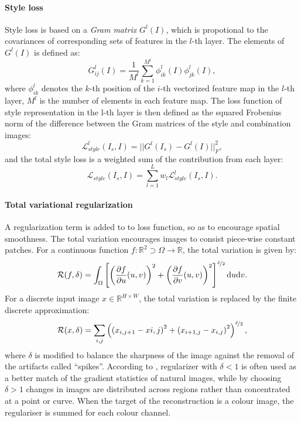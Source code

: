 \documentclass{article}
\begin{document}
\paragraph{Style loss} Style loss is based on a \textit{Gram matrix} $G^l(I)$,
which is propotional to the covariances of corresponding sets of features in the $l$-th layer. The elements of $G^l(I)$ is defined as:
\begin{equation}
G_{ij}^l(I) = \frac{1}{M^l}\sum_{k=1}^{M^l}\phi_{ik}^l(I)\phi_{jk}^l(I),
\end{equation}
where $\phi_{ik}^l$ denotes the $k$-th position of the $i$-th vectorized feature map in the $l$-th layer, $M^l$ is the number of elements in each feature map. 
The loss function of style representation in the l-th layer is then defined as the squared Frobenius norm of the difference between the Gram matrices of the style
and combination images:
\begin{equation}
\mathcal{L}_{style}^l(I_s,I) = ||G^l(I_s) - G^l(I)||_F^2,
\end{equation}
and the total style loss is a weighted sum of the contribution from each layer:
\begin{equation}
\mathcal{L}_{style}(I_s,I) = \sum_{l=1}^Lw_l\mathcal{L}_{style}^l(I_s,I).
\end{equation}

\paragraph{Total variational regularization} A regularization term is added to to loss function, so as to encourage spatial smoothness. 
The total variation encourages images to consist piece-wise constant patches. 
For a continuous function $f:\mathbb{R}^2\supset \Omega \to \mathbb{R}$, the total variation is given by:
\begin{equation}
\mathcal{R}(f,\delta) = \int_{\Omega}\left[
\left(\frac{\partial f}{\partial u}(u,v)\right)^2 + 
\left(\frac{\partial f}{\partial v}(u,v)\right)^2
\right]^{\nicefrac{\delta}{2}}\text{d}u\text{d}v.
\end{equation}
For a discrete input image $x\in\mathbb{R}^{H\times W}$, the total variation is replaced by the finite discrete approximation:
\begin{equation}
\mathcal{R}(x,\delta) = \sum_{i,j}\left(
\left(x_{i,j+1}-x{i,j}\right)^2 + 
\left(x_{i+1,j}-x_{i,j}\right)^2 
\right)^{\nicefrac{\delta}{2}},
\end{equation}
where $\delta$ is modified to balance the sharpness of the image against the removal of the artifacts called ``spikes''.
According to \citet{krishnan2009fast}, regularizer with $\delta<1$ is often used as a better match of the gradient statistics of natural images, 
while by choosing $\delta>1$ changes in images are distributed across regions rather than concentrated at a point or curve. 
When the target of the reconstruction is a colour image, 
the regulariser is summed for each colour channel.
\end{document}
